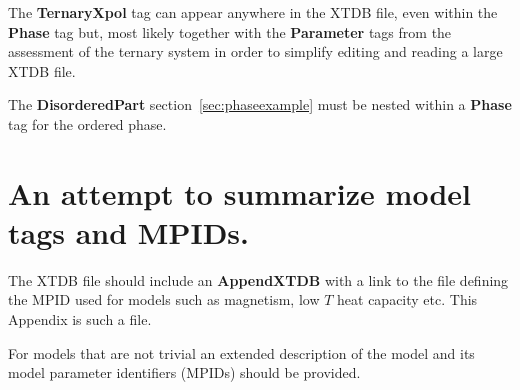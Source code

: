 \documentclass{article}
\begin{document}
\begin{appendices}
The {\bf TernaryXpol} tag can appear anywhere in the XTDB file, even
within the {\bf Phase} tag but, most likely together with the {\bf
  Parameter} tags from the assessment of the ternary system in order
to simplify editing and reading a large XTDB file.

The {\bf DisorderedPart} section~\ref{sec:phaseexample} must be nested
within a {\bf Phase} tag for the ordered phase.

\newpage 

\setcounter{equation}{0}
\renewcommand{\theequation}{B\arabic{equation}}
\setcounter{figure}{0}
\renewcommand{\thefigure}{B\arabic{figure}}

\section{An attempt to summarize model tags and MPIDs.}\label{sec:modelapp}

The XTDB file should include an {\bf AppendXTDB} with a link to the
file defining the MPID used for models such as magnetism, low $T$ heat
capacity etc.  This Appendix is such a file.

For models that are not trivial an extended description of the model
and its model parameter identifiers (MPIDs) should be provided.


\end{appendices}
\end{document}
